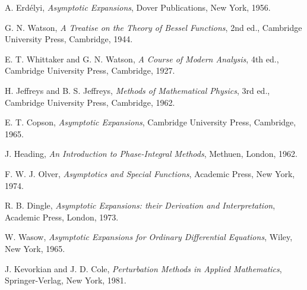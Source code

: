 \documentclass[11pt]{article}
\begin{document}
\begin{thebibliography}{99}

 A. Erdélyi, \emph{Asymptotic Expansions}, Dover Publications, New York, 1956.

 G. N. Watson, \emph{A Treatise on the Theory of Bessel Functions}, 2nd ed., Cambridge University Press, Cambridge, 1944.

 E. T. Whittaker and G. N. Watson, \emph{A Course of Modern Analysis}, 4th ed., Cambridge University Press, Cambridge, 1927.

 H. Jeffreys and B. S. Jeffreys, \emph{Methods of Mathematical Physics}, 3rd ed., Cambridge University Press, Cambridge, 1962.

 E. T. Copson, \emph{Asymptotic Expansions}, Cambridge University Press, Cambridge, 1965.

 J. Heading, \emph{An Introduction to Phase-Integral Methods}, Methuen, London, 1962.

 F. W. J. Olver, \emph{Asymptotics and Special Functions}, Academic Press, New York, 1974.

 R. B. Dingle, \emph{Asymptotic Expansions: their Derivation and Interpretation}, Academic Press, London, 1973.

 W. Wasow, \emph{Asymptotic Expansions for Ordinary Differential Equations}, Wiley, New York, 1965.

 J. Kevorkian and J. D. Cole, \emph{Perturbation Methods in Applied Mathematics}, Springer-Verlag, New York, 1981.

\end{thebibliography}
\end{document}
